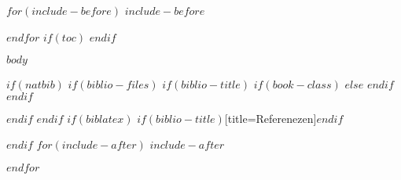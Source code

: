 \documentclass[10pt,german,a4,titlepage]{scrbook}
\makeatletter
\def\maxwidth{\ifdim\Gin@nat@width>\linewidth\linewidth
\else\Gin@nat@width\fi}
\let\Oldincludegraphics\includegraphics
\renewcommand{\includegraphics}[1]{\Oldincludegraphics[width=\maxwidth]{#1}}
\makeatother
\begin{document}
\frontmatter




\pagecolor{white}
\pagestyle{plain}





$for(include-before)$
$include-before$

$endfor$
$if(toc)$
{
\hypersetup{linkcolor=black}
\setcounter{tocdepth}{3}
\tableofcontents
}
$endif$

\thispagestyle{empty}

\mainmatter
\pagestyle{headings}


$body$

$if(natbib)$
$if(biblio-files)$
$if(biblio-title)$
$if(book-class)$
\renewcommand\bibname{$biblio-title$}
$else$
\renewcommand\refname{$biblio-title$}
$endif$
$endif$


$endif$
$endif$
$if(biblatex)$
\printbibliography$if(biblio-title)$[title=Referenezen]$endif$

$endif$
$for(include-after)$
$include-after$

$endfor$
\end{document}
